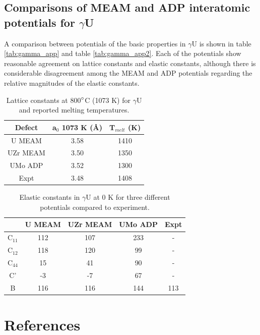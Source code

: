 \documentclass[review]{elsarticle}
\begin{document}
\subsection{Comparisons of MEAM and ADP interatomic potentials for $\gamma$U}

A comparison between potentials of the basic properties in $\gamma$U is shown in table \ref{tab:gamma_app} and table \ref{tab:gamma_app2}. Each of the potentials show reasonable agreement on lattice constants and elastic constants, although there is considerable disagreement among the MEAM and ADP potentials regarding the relative magnitudes of the elastic constants. 

\begin{table}[h]
\caption{Lattice constants at 800$\degree$C (1073 K) for $\gamma$U and reported melting temperatures.} \label{tab:gamma_app}
\begin{center}
\begin{tabular}{|c|c|c|}
	\hline
	Defect & a$_{0}$ 1073 K (\AA) & T$_{melt}$ (K) \\
	 \hline
	U MEAM \cite{beeler_meam} & 3.58 & 1410 \\
	UZr MEAM \cite{moore2015} & 3.50 & 1350 \\
	UMo ADP	\cite{smirnovaADP}	& 3.52 & 1300 \\
	Expt 	& 3.48 \cite{wilson1949} & 1408 \cite{weeks2003} \\
	\hline
\end{tabular}
\end{center}
\label{default}
\end{table}

\begin{table}[h]
\caption{Elastic constants in $\gamma$U at 0 K for three different potentials compared to experiment.} \label{tab:gamma_app2}
\begin{center}
\begin{tabular}{|c|c|c|c|c|}
	\hline
	& U MEAM & UZr MEAM & UMo ADP & Expt \cite{yoo1998} \\
	 \hline
	C$_{11}$ & 112 & 107 & 233 & - \\
	C$_{12}$ & 118 & 120 & 99 & - \\
	C$_{44}$ & 15 & 41 & 90 & - \\
	C' & -3 & -7 & 67 & - \\
	B & 116 & 116 & 144 & 113 \\
	\hline
\end{tabular}
\end{center}
\label{default}
\end{table}

\section{References}


\end{document}
